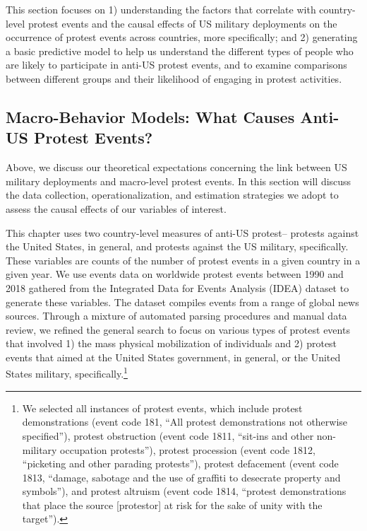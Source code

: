		This section focuses on 1) understanding the factors that correlate with country-level protest events and the causal effects of US military deployments on the occurrence of protest events across countries, more specifically; and 2) generating a basic predictive model to help us understand the different types of people who are likely to participate in anti-US protest events, and to examine comparisons between different groups and their likelihood of engaging in protest activities.
		
		
		
		\subsection*{Macro-Behavior Models: What Causes Anti-US Protest Events?}
		
		Above, we discuss our theoretical expectations concerning the link between US military deployments and macro-level protest events. In this section will discuss the data collection, operationalization, and estimation strategies we adopt to assess the causal effects of our variables of interest. 
		
		This chapter uses two country-level measures of anti-US protest-- protests against the United States, in general, and protests against the US military, specifically. These variables are counts of the number of protest events in a given country in a given year. We use events data on worldwide protest events between 1990 and 2018 gathered from the Integrated Data for Events Analysis (IDEA) dataset to generate these variables.\cite{Bond2003} The dataset compiles events from a range of global news sources. Through a mixture of automated parsing procedures and manual data review, we refined the general search to focus on various types of protest events that involved 1) the mass physical mobilization of individuals and 2) protest events that aimed at the United States government, in general, or the United States military, specifically.\footnote{We selected all instances of protest events, which include protest demonstrations (event code 181, ``All protest demonstrations not otherwise specified''), protest obstruction (event code 1811, ``sit-ins and other non-military occupation protests''), protest procession (event code 1812, ``picketing and other parading protests''), protest defacement (event code 1813, ``damage, sabotage and the use of graffiti to desecrate property and symbols''), and protest altruism (event code 1814, ``protest demonstrations that place the source [protestor] at risk for the sake of unity with the target'').}
		
